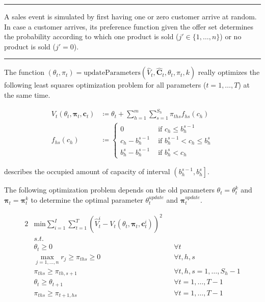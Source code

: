 \noindent\rule{\textwidth}{1pt}
A sales event is simulated by first having one or zero customer arrive at random. In case a customer arrives, its preference function given the offer set determines the probability according to which one product is sold ($j' \in \{1, \dots, n\}$) or no product is sold ($j' = 0$).

\noindent\rule{\textwidth}{1pt}
The function $\left(\theta_t, \pi_t \right) = \text{updateParameters}\left(\hat{V}_t, \mathbf{\hat{C}}_t, \theta_t, \pi_t, k\right)$ really optimizes the following least squares optimization problem for all parameters ($t = 1, \dots, T$) at the same time.

\begin{align}
V_t(\theta_t, \mathbf{\pi}_t, \mathbf{c}_t) & \coloneqq \theta_t + \sum_{h=1}^{m}\sum_{s=1}^{S_h} \pi_{ths} f_{hs}(c_h) \\
f_{hs}(c_h) &\coloneqq 
\begin{cases}\label{def-f}
0 & \text{ if } c_h \leq b_h^{s-1}\\
c_h - b_h^{s-1} & \text{ if } b_h^{s-1} < c_h \leq b_h^s \\
b_h^s - b_h^{s-1} & \text{ if } b_h^s < c_h
\end{cases}
\end{align}

 describes the occupied amount of capacity of interval $\left(b_h^{s-1}, b_h^s\right]$.

The following optimization problem depends on the old parameters $\theta_t = \theta_t^k$ and $\mathbf{\pi}_t = \mathbf{\pi}_t^k$ to determine the optimal parameter $\theta_t^{update}$ and $\mathbf{\pi}_t^{update}$.

\begin{alignat}{2}
& \text{min} \sum_{i=1}^{I}\sum_{t=1}^{T} \left( \hat{V}_t^i - V_t(\theta_t, \mathbf{\pi}_t, \mathbf{c}_t^i) \right)^2 && \\
& s.t. && \\
& \theta_t \geq 0 && \forall t\\
& \max_{j=1, \dots, n} r_j \geq \pi_{ths} \geq 0 && \forall t, h, s\\
& \pi_{ths} \geq \pi_{th,s+1} && \forall t, h, s = 1, \dots, S_h-1\\
& \theta_t \geq \theta_{t+1} && \forall t = 1, \dots, T-1\\
& \pi_{ths} \geq \pi_{t+1,hs} && \forall t = 1, \dots, T-1
\end{alignat}

